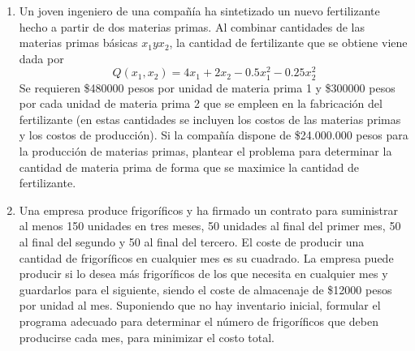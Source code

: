 \documentclass[12pt]{article}
\begin{document}
\begin{center}
\begin{enumerate}
            \item Un joven ingeniero de una compañía ha sintetizado un nuevo fertilizante hecho a partir de dos materias primas. 
            Al combinar cantidades de las materias primas básicas $x_{1} y x_{2}$,
            la cantidad de fertilizante que se obtiene viene dada por
            \[
                Q(x_{1},x_{2}) = 4x_{1} + 2x_{2} - 0.5x_{1}^{2}- 0.25x_{2}^{2}
            \]  
            Se requieren \$480000 pesos por unidad de materia prima 1 y \$300000 pesos por cada unidad de materia prima 2 que se empleen en la fabricación del fertilizante (en estas cantidades se incluyen los costos de las materias primas y los costos de producción). 
            Si la compañía dispone de \$24.000.000 pesos para la producción de materias primas, plantear el problema para determinar la cantidad de materia prima de forma que se maximice la cantidad de fertilizante.

            \item Una empresa produce frigoríficos y ha firmado un contrato para suministrar al menos 150 unidades en tres meses, 50 unidades al final del primer mes, 50 al final del segundo y 50 al final del tercero. 
            El coste de producir una cantidad de frigoríficos en cualquier mes es su
            cuadrado. 
            La empresa puede producir si lo desea más frigoríficos de los que necesita en
            cualquier mes y guardarlos para el siguiente, siendo el coste de almacenaje de \$12000 pesos por unidad al mes. 
            Suponiendo que no hay inventario inicial, formular el programa adecuado para determinar el número de frigoríficos que deben producirse cada mes, para
            minimizar el costo total.



\end{enumerate}
\end{center}
\end{document}
